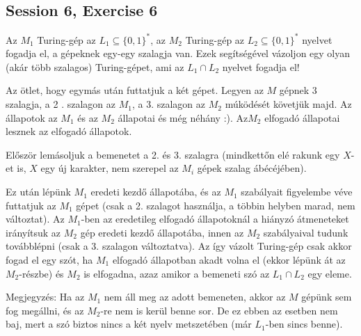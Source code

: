 \subsection{Session 6, Exercise 6}


Az $M_{1}$ Turing-gép az $L_{1} \subseteq\{0,1\}^{*}$, az $M_{2}$ Turing-gép az $L_{2} \subseteq\{0,1\}^{*}$ nyelvet fogadja el, a gépeknek egy-egy szalagja van. Ezek segítségével vázoljon egy olyan (akár több szalagos) Turing-gépet, ami az $L_{1} \cap L_{2}$ nyelvet fogadja el!


Az ötlet, hogy egymás után futtatjuk a két gépet. Legyen az $M$ gépnek 3 szalagja, a 2 . szalagon az $M_{1}$, a 3. szalagon az $M_{2}$ múködését követjük majd. Az állapotok az $M_{1}$ és az $M_{2}$ állapotai és még néhány :). $\mathrm{Az} M_{2}$ elfogadó állapotai lesznek az elfogadó állapotok.

Először lemásoljuk a bemenetet a 2. és 3. szalagra (mindkettőn elé rakunk egy $X$-et is, $X$ egy új karakter, nem szerepel az $M_{i}$ gépek szalag ábécéjében).

Ez után lépünk $M_{1}$ eredeti kezdő állapotába, és az $M_{1}$ szabályait figyelembe véve futtatjuk az $M_{1}$ gépet (csak a 2. szalagot használja, a többin helyben marad, nem változtat). Az $M_{1}$-ben az eredetileg elfogadó állapotoknál a hiányzó átmeneteket irányítsuk az $M_{2}$ gép eredeti kezdő állapotába, innen az $M_{2}$ szabályaival tudunk továbblépni (csak a 3. szalagon változtatva). Az így vázolt Turing-gép csak akkor fogad el egy szót, ha $M_{1}$ elfogadó állapotban akadt volna el (ekkor lépünk át az $M_{2}$-részbe) és $M_{2}$ is elfogadna, azaz amikor a bemeneti szó az $L_{1} \cap L_{2}$ egy eleme.

Megjegyzés: Ha az $M_{1}$ nem áll meg az adott bemeneten, akkor az $M$ gépünk sem fog megállni, és az $M{ }_{2}$-re nem is kerül benne sor. De ez ebben az esetben nem baj, mert a szó biztos nincs a két nyelv metszetében (már $L_{1}$-ben sincs benne).